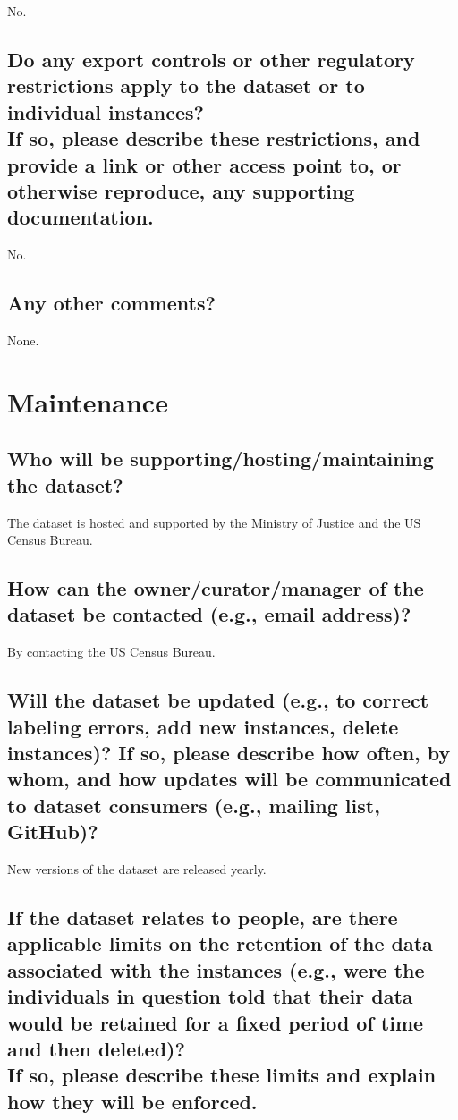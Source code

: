 \documentclass[letterpaper, 10 pt, conference]{ieeeconf}  %
\newcommand{\subtitle}[1]{{\\ \small \normalfont \color{purple} #1}}
\begin{document}
No.

\subsection{Do any export controls or other regulatory restrictions apply to the dataset or to individual instances? \subtitle{If so, please describe these restrictions, and provide a link or other access point to, or otherwise reproduce, any supporting documentation.}}

No.

\subsection{Any other comments?}

None.

\section{Maintenance}

\subsection{Who will be supporting/hosting/maintaining the dataset?}

The dataset is hosted and supported by the Ministry of Justice and the US Census Bureau.

\subsection{How can the owner/curator/manager of the dataset be contacted (e.g., email address)?}

By contacting the US Census Bureau.

\subsection{Will the dataset be updated (e.g., to correct labeling errors, add new instances, delete instances)? If so, please describe how often, by whom, and how updates will be communicated to dataset consumers (e.g., mailing list, GitHub)?}

New versions of the dataset are released yearly.

\subsection{If the dataset relates to people, are there applicable limits on the retention of the data associated with the instances (e.g., were the individuals in question told that their data would be retained for a fixed period of time and then deleted)? \subtitle{If so, please describe these limits and explain how they will be enforced.}}
\end{document}
